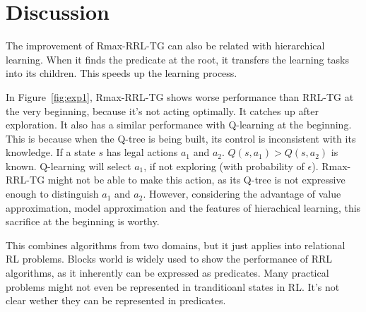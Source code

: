\documentclass[10pt]{article}
\begin{document}
\section{Discussion}

The improvement of Rmax-RRL-TG can also be related with hierarchical learning.
When it finds the predicate at the root, it transfers the learning tasks into
its children. This speeds up the learning process.

In Figure~\ref{fig:exp1}, Rmax-RRL-TG shows worse performance than RRL-TG at the
very beginning, because it's not acting optimally. It catches up after
exploration. It also has a similar performance with Q-learning at the beginning.
This is because when the Q-tree is being built, its control is inconsistent with
its knowledge. If a state $s$ has legal actions $a_1$ and $a_2$. $Q(s, a_1) >
Q(s, a_2)$ is known. Q-learning will select $a_1$, if not exploring (with
probability of $\epsilon$). Rmax-RRL-TG might not be able to make this action,
as its Q-tree is not expressive enough to distinguish $a_1$ and $a_2$. However,
considering the advantage of value approximation, model approximation and the
features of hierachical learning, this sacrifice at the beginning is worthy.

This combines algorithms from two domains, but it just applies into relational
RL problems. Blocks world is widely used to show the performance of RRL
algorithms, as it inherently can be expressed as predicates. Many practical
problems might not even be represented in tranditioanl states in RL. It's not
clear wether they can be represented in predicates.




\end{document}
